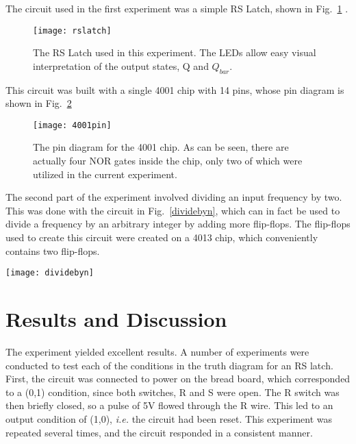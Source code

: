 \documentclass[aps,pre,twocolumn,nofootinbib]{revtex4}
\begin{document}
The circuit used in the first experiment was a simple RS Latch, shown in Fig.~\ref{rslatch} \cite{powell}.  

\begin{figure}[h]
\centering
\texttt{[image: rslatch]} 
\caption{The RS Latch used in this experiment.  The LEDs allow easy visual interpretation of the output states, Q and $Q_{bar}$.}
\label{rslatch}
\end{figure}

This circuit was built with a single 4001 chip with 14 pins, whose pin diagram is shown in Fig.~\ref{4001pin}

\begin{figure}[h]
\centering
\texttt{[image: 4001pin]} 
\caption{The pin diagram for the 4001 chip.  As can be seen, there are actually four NOR gates inside the chip, only two of which were utilized in the current experiment.}
\label{4001pin}
\end{figure}

The second part of the experiment involved dividing an input frequency by two.  This was done with the circuit in Fig.~\ref{dividebyn}, which can in fact be used to divide a frequency by an arbitrary integer by adding more flip-flops.  The flip-flops used to create this circuit were created on a 4013 chip, which conveniently contains two flip-flops.  

\begin{figure*}[hbtp]
\centering
\texttt{[image: dividebyn]} 
\caption{This circuit is a set of cascaded edge-triggered flip flops, which divides the input frequency by the number of flip-flops, (n).  In the case of the current experiment, n was set at 2.  For the final flip-flop, the output, $Q_{bar}$ should only connect back to the D pin, since there is no further circuit element for it to link into.}
\label{dividebyn}
\end{figure*}

\section{Results and Discussion}

The experiment yielded excellent results.  A number of experiments were conducted to test each of the conditions in the truth diagram for an RS latch.  First, the circuit was connected to power on the bread board, which corresponded to a (0,1) condition, since both switches, R and S were open.  The R switch was then briefly closed, so a pulse of 5V flowed through the R wire.  This led to an output condition of (1,0), \textit{i.e.} the circuit had been reset.  This experiment was repeated several times, and the circuit responded in a consistent manner.  
\end{document}
